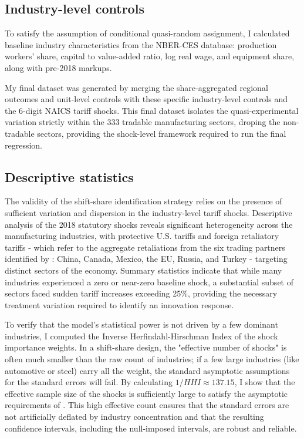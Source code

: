\documentclass[12pt]{article}
\numberwithin{figure}{section}
\numberwithin{table}{section}
\begin{document}
\subsection{Industry-level controls}

To satisfy the \cite{BHJ2022} assumption of conditional quasi-random assignment, I calculated baseline industry characteristics from the NBER-CES database: production workers' share, capital to value-added ratio, log real wage, and equipment share, along with pre-2018 markups.

My final dataset was generated by merging the share-aggregated regional outcomes and unit-level controls with these specific industry-level controls and the 6-digit NAICS tariff shocks. This final dataset isolates the quasi-experimental variation strictly within the $333$ tradable manufacturing sectors, droping the non-tradable sectors, providing the shock-level framework required to run the final regression.

\subsection{Descriptive statistics}

The validity of the shift-share identification strategy relies on the presence of sufficient variation and dispersion in the industry-level tariff shocks. Descriptive analysis of the 2018 statutory shocks reveals significant heterogeneity across the manufacturing industries, with protective U.S. tariffs and foreign retaliatory tariffs - which refer to the aggregate retaliations from the six trading partners identified by \cite{Fajgelbaum2020}: China, Canada, Mexico, the EU, Russia, and Turkey - targeting distinct sectors of the economy. Summary statistics indicate that while many industries experienced a zero or near-zero baseline shock, a substantial subset of sectors faced sudden tariff increases exceeding 25\%, providing the necessary treatment variation required to identify an innovation response.

To verify that the model's statistical power is not driven by a few dominant industries, I computed the Inverse Herfindahl-Hirschman Index of the shock importance weights. In a shift-share design, the "effective number of shocks" is often much smaller than the raw count of industries; if a few large industries (like automotive or steel) carry all the weight, the standard asymptotic assumptions for the standard errors will fail. By calculating $1/HHI \approx 137.15$, I show that the effective sample size of the shocks is sufficiently large to satisfy the asymptotic requirements of \cite{BHJ2022}. This high effective count ensures that the standard errors are not artificially deflated by industry concentration and that the resulting confidence intervals, including the null-imposed intervals, are robust and reliable.
\end{document}
